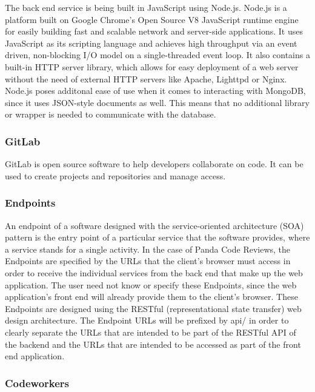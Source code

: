 The back end service is being built in JavaScript using Node.js. Node.js is a
platform built on Google Chrome's Open Source V8 JavaScript runtime engine for
easily building fast and scalable network and server-side applications. It uses
JavaScript as its scripting language and achieves high throughput via an event
driven, non-blocking I/O model on a single-threaded event loop. It also contains
a built-in HTTP server library, which allows for easy deployment of a web server
without the need of external HTTP servers like Apache, Lighttpd or Nginx.
Node.js poses additonal ease of use when it comes to interacting with MongoDB,
since it uses JSON-style documents as well. This means that no additional
library or wrapper is needed to communicate with the database.

\subsubsection{GitLab}

GitLab is open source software to help developers collaborate on code. It can be
used to create projects and repositories and manage access.

\subsubsection{Endpoints}

An endpoint of a software designed with the service-oriented architecture (SOA)
pattern is the entry point of a particular service that the software provides,
where a service stands for a single activity. In the case of Panda Code Reviews,
the Endpoints are specified by the URLs that the client's browser must access in
order to receive the individual services from the back end that make up the web
application. The user need not know or specify these Endpoints, since the web
application's front end will already provide them to the client's browser. These
Endpoints are designed using the RESTful (representational state transfer) web
design architecture. The Endpoint URLs will be prefixed by api/ in order to
clearly separate the URLs that are intended to be part of the RESTful API of
the backend and the URLs that are intended to be accessed as part of the front
end application.

\subsubsection{Codeworkers}

